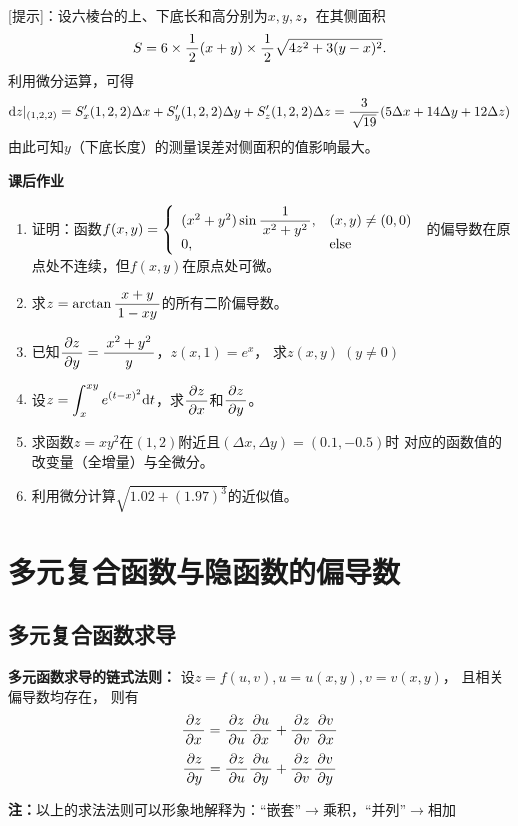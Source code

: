[提示]：设六棱台的上、下底长和高分别为$x,y,z$，在其侧面积
$$S=6\times\df12(x+y)\times\df12\sqrt{4z^2+3(y-x)^2}.$$
利用微分运算，可得
$$\d z|_{(1,2,2)}=S'_x(1,2,2)\Delta x+S'_y(1,2,2)\Delta y+
S'_z(1,2,2)\Delta z=\df3{\sqrt{19}}(5\Delta x+14\Delta y+12\Delta z)$$
由此可知$y$（下底长度）的测量误差对侧面积的值影响最大。

\begin{ext}
	{\bf 课后作业}
	\begin{enumerate}
	  \item 证明：函数$f(x,y)=\left\{\begin{array}{ll}
	  	(x^2+y^2)\sin\df1{x^2+y^2}, & (x,y)\ne(0,0)\\
	  	0, & \mathrm{else}
	  \end{array}\right.$
	  的偏导数在原点处不连续，但$f(x,y)$在原点处可微。
	  \item 求$z=\arctan\df{x+y}{1-xy}$的所有二阶偏导数。
	  \item 已知$\df{\p z}{\p y}=\df{x^2+y^2}y$，$z(x,1)=e^x$，
	  求$z(x,y)\;(y\ne 0)$
	  \item 设$z=\dint_x^{xy}e^{(t-x)^2}\d t$，求$\df{\p z}{\p x}$和$\df{\p z}{\p y}$。
	  \item 求函数$z=xy^2$在$(1,2)$附近且$(\Delta x,\Delta y)=(0.1,-0.5)$时
	  对应的函数值的改变量（全增量）与全微分。
	  \item 利用微分计算$\sqrt{1.02+(1.97)^3}$的近似值。
	\end{enumerate}
\end{ext}

\section{多元复合函数与隐函数的偏导数}

\subsection{多元复合函数求导}

\begin{thx}
	{\bf 多元函数求导的链式法则：}
	设$z=f(u,v),u=u(x,y),v=v(x,y)$， 且相关偏导数均存在， 则有
	$${\df{\p z}{\p x}=\df{\p z}{\p u}\df{\p u}{\p x}
	+\df{\p z}{\p v}\df{\p v}{\p x}}$$
	$${\df{\p z}{\p y}=\df{\p z}{\p u}\df{\p u}{\p y}
	+\df{\p z}{\p v}\df{\p v}{\p y}}$$
\end{thx}

{\bf 注：}以上的求法法则可以形象地解释为：{\kaishu “嵌套”$\to$乘积，“并列”$\to$相加}

